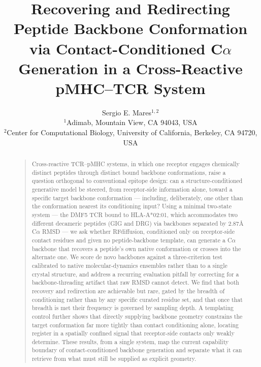 \documentclass[letterpaper]{article}
\begin{document}
\title{Recovering and Redirecting Peptide Backbone Conformation via Contact-Conditioned C$\alpha$ Generation in a Cross-Reactive pMHC--TCR System}
\author{Sergio E. Mares$^{1,2}$ \\
{\small $^1$Adimab, Mountain View, CA 94043, USA} \\
{\small $^2$Center for Computational Biology, University of California, Berkeley, CA 94720, USA}}
\nocopyright
\maketitle

\begin{abstract}
\begin{quote}
Cross-reactive TCR--pMHC systems, in which one receptor engages chemically distinct peptides through
distinct bound backbone conformations, raise a question orthogonal to conventional epitope design: can a
structure-conditioned generative model be steered, from receptor-side information alone, toward a specific
target backbone conformation --- including, deliberately, one other than the conformation nearest its
conditioning input? Using a minimal two-state system --- the DMF5 TCR bound to HLA-A*02:01, which
accommodates two different decameric peptides (GIG and DRG) via backbones separated by 2.87\AA{} C$\alpha$
RMSD --- we ask whether RFdiffusion, conditioned only on receptor-side contact residues and given no
peptide-backbone template, can generate a C$\alpha$ backbone that recovers a peptide's own native
conformation or crosses into the alternate one. We score de novo backbones against a three-criterion test
calibrated to native molecular-dynamics ensembles rather than to a single crystal structure, and address a
recurring evaluation pitfall by correcting for a backbone-threading artifact that raw RMSD cannot detect.
We find that both recovery and redirection are achievable but rare, gated by the breadth of conditioning
rather than by any specific curated residue set, and that once that breadth is met their frequency is
governed by sampling depth. A templating control further shows that directly supplying backbone geometry
constrains the target conformation far more tightly than contact conditioning alone, locating register in a
spatially confined signal that receptor-side contacts only weakly determine. These results, from a single
system, map the current capability boundary of contact-conditioned backbone generation and separate what
it can retrieve from what must still be supplied as explicit geometry.
\end{quote}
\end{abstract}
\end{document}
